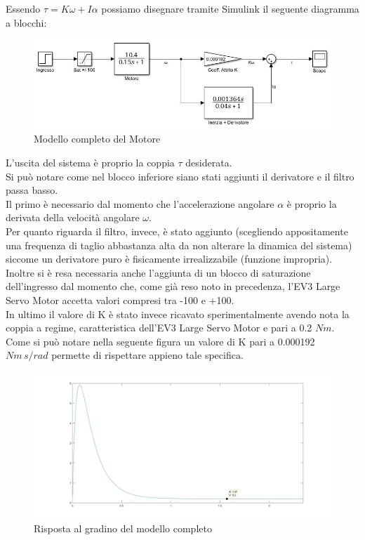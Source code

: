 Essendo $\tau=K\omega+I\alpha$ possiamo disegnare tramite Simulink il seguente diagramma a blocchi:
\begin{figure}[ht]
	\centering
	\includegraphics[width=\textwidth]{modMotoreTorque.jpg}
	\caption{Modello completo del Motore}
	\label{modMotoreTorque}
\end{figure}
L'uscita del sistema è proprio la coppia $\tau$ desiderata.\\
Si può notare come nel blocco inferiore siano stati aggiunti il derivatore e il filtro passa basso.\\
Il primo è necessario dal momento che l'accelerazione angolare $\alpha$ è proprio la derivata della velocità angolare $\omega$.\\
Per quanto riguarda il filtro, invece, è stato aggiunto (scegliendo appositamente una frequenza di taglio abbastanza alta da non alterare la dinamica del sistema) siccome un derivatore puro è fisicamente irrealizzabile (funzione impropria).\\
Inoltre si è resa necessaria anche l'aggiunta di un blocco di saturazione dell'ingresso dal momento che, come già reso noto in precedenza, l'EV3 Large Servo Motor accetta valori compresi tra -100 e +100.\\
In ultimo il valore di K è stato invece ricavato sperimentalmente avendo nota la coppia a regime, caratteristica dell'EV3 Large Servo Motor e pari a 0.2 $Nm$.\\
Come si può notare nella seguente figura un valore di K pari a 0.000192 $Nm\,s/rad$ permette di rispettare appieno tale specifica.
\begin{figure}[ht]
	\centering
	\includegraphics[width=\textwidth]{torque02.jpg}
	\caption{Risposta al gradino del modello completo}
	\label{torque02}
\end{figure}